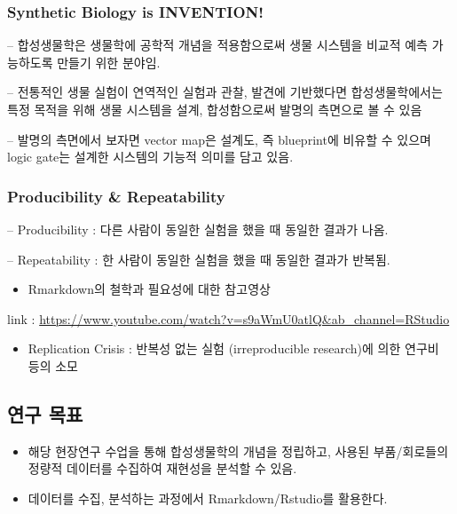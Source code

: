 \documentclass[
]{article}
\providecommand{\tightlist}{%
  \setlength{\itemsep}{0pt}\setlength{\parskip}{0pt}}
\begin{document}
\hypertarget{synthetic-biology-is-invention}{%
\subsubsection{Synthetic Biology is
INVENTION!}\label{synthetic-biology-is-invention}}

-- 합성생물학은 생물학에 공학적 개념을 적용함으로써 생물 시스템을 비교적
예측 가능하도록 만들기 위한 분야임.

-- 전통적인 생물 실험이 연역적인 실험과 관찰, 발견에 기반했다면
합성생물학에서는 특정 목적을 위해 생물 시스템을 설계, 합성함으로써
발명의 측면으로 볼 수 있음

-- 발명의 측면에서 보자면 vector map은 설계도, 즉 blueprint에 비유할 수
있으며 logic gate는 설계한 시스템의 기능적 의미를 담고 있음.

\hypertarget{producibility-repeatability}{%
\subsubsection{Producibility \&
Repeatability}\label{producibility-repeatability}}

-- Producibility : 다른 사람이 동일한 실험을 했을 때 동일한 결과가 나옴.

-- Repeatability : 한 사람이 동일한 실험을 했을 때 동일한 결과가 반복됨.

\begin{itemize}
\tightlist
\item
  Rmarkdown의 철학과 필요성에 대한 참고영상
\end{itemize}

link :
\url{https://www.youtube.com/watch?v=s9aWmU0atlQ\&ab_channel=RStudio}

\begin{itemize}
\tightlist
\item
  Replication Crisis : 반복성 없는 실험 (irreproducible research)에 의한
  연구비 등의 소모
\end{itemize}

\hypertarget{uxc5f0uxad6c-uxbaa9uxd45c}{%
\subsection{연구 목표}\label{uxc5f0uxad6c-uxbaa9uxd45c}}

\begin{itemize}
\item
  해당 현장연구 수업을 통해 합성생물학의 개념을 정립하고, 사용된
  부품/회로들의 정량적 데이터를 수집하여 재현성을 분석할 수 있음.
\item
  데이터를 수집, 분석하는 과정에서 Rmarkdown/Rstudio를 활용한다.
\end{itemize}
\end{document}
